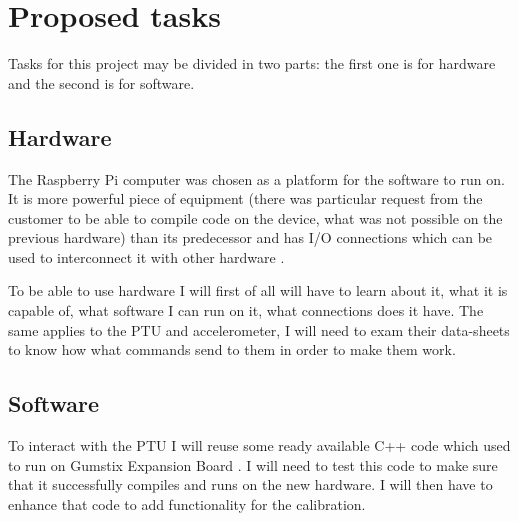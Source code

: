 \documentclass[11pt,fleqn,twoside]{article}
\begin{document}
\section{Proposed tasks}

Tasks for this project may be divided in two parts: the first one is for hardware and the second is for software. 

\subsection{Hardware}
The Raspberry Pi computer was chosen as a platform for the software to run on. It is more powerful piece of equipment (there was particular request from the customer to be able to compile code on the device, what was not possible on the previous hardware) than its predecessor and has I/O connections which can be used to interconnect it with other hardware\cite{C_library_for_RPi} \cite{rpi_gpio}. 


To be able to use hardware I will first of all will have to learn about it, what it is capable of, what software I can run on it, what connections does it have. The same applies to the PTU and accelerometer, I will need to exam their data-sheets to know how what commands send to them in order to make them work. 

\subsection{Software}
To interact with the PTU I will reuse some ready available C++ code which used to run on Gumstix Expansion Board \cite{gumstix_com}. I will need to test this code to make sure that it successfully compiles and runs on the new hardware. I will then have to enhance that code to add functionality for the calibration.
\end{document}
